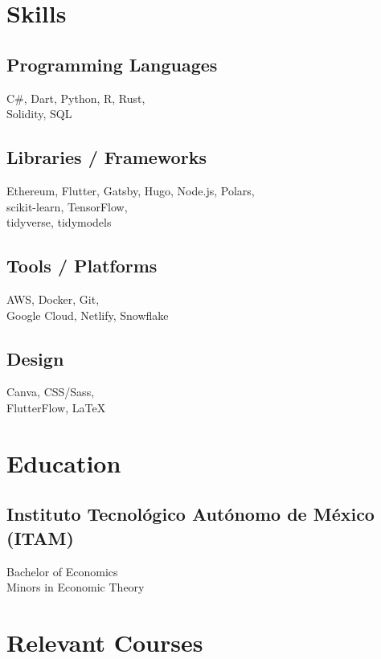 \documentclass[]{resume}
\begin{document}
\begin{minipage}[t]{0.25\textwidth} 


\section{Skills}
\subsection{Programming Languages}
\sectionsep
C\#,
Dart,
Python,
R,
Rust, \\
Solidity,
SQL
\sectionsep
\sectionsep
\subsection{Libraries / Frameworks}
\sectionsep
Ethereum,
Flutter,
Gatsby,
Hugo,
Node.js,
Polars, \\
scikit-learn,
TensorFlow, \\
tidyverse,
tidymodels
\sectionsep
\sectionsep
\subsection{Tools / Platforms}
AWS,
Docker,
Git, \\
Google Cloud,
Netlify,
Snowflake
\sectionsep
\sectionsep
\subsection{Design}
Canva,
CSS/Sass, \\
FlutterFlow,
LaTeX
\sectionsep
\sectionsep


\section{Education} 
\subsection{Instituto Tecnológico Autónomo de México (ITAM)}
\sectionsep
Bachelor of Economics \\
Minors in Economic Theory \\
\sectionsep
\sectionsep


\section{Relevant Courses} 

\end{minipage}
\end{document}
